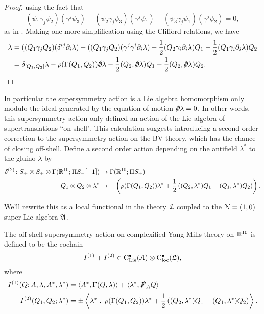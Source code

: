 \documentclass[10pt, oneside]{article}
\begin{document}
\begin{proof}
using the fact that 
\[(\psi_1 \gamma_j \psi_2)(\gamma^j \psi_3) + (\psi_2 \gamma_j \psi_3)(\gamma^j \psi_1) + (\psi_3 \gamma_j \psi_1)(\gamma^j \psi_2) = 0,\]
as in \cite[Theorem 11]{BaezHuerta}.  Making one more simplification using the Clifford relations, we have
\begin{align*}
[\delta_{Q_1}, \delta_{Q_2}] \lambda &= ((Q_1 \gamma_j Q_2) (\delta^{ij} \dd_i \lambda) - ((Q_1 \gamma_j Q_2) (\gamma^j \gamma^i \dd_i \lambda) - \frac 12(Q_2 \gamma_i \dd_i \lambda)Q_1 - \frac 12(Q_1 \gamma_i \dd_i \lambda)Q_2 \\
&= \delta_{[Q_1,Q_2]} \lambda - \rho(\Gamma(Q_1,Q_2)) \sd \dd \lambda - \frac 12(Q_2, \sd \dd \lambda)Q_1 - \frac 12(Q_2, \sd \dd \lambda)Q_2.
\end{align*}
\end{proof}

In particular the supersymmetry action is a Lie algebra homomorphism only modulo the ideal generated by the equation of motion $\sd \dd \lambda = 0$.
In other words, this supersymmetry action only defined an action of the Lie algebra of supertranslations ``on-shell".  This calculation suggests introducing a second order correction to the supersymmetry action on the BV theory, which has the chance of closing off-shell.  Define a second order action depending on the antifield $\lambda^*$ to the gluino $\lambda$ by
\begin{align*}
\delta^{(2)} \colon S_+ \otimes S_+ \otimes \Gamma(\mathbb R^{10}; \Pi S_-[-1]) &\to \Gamma(\mathbb R^{10}; \Pi S_+) \\
Q_1 \otimes Q_2 \otimes \lambda^* &\mapsto - \left(\rho(\Gamma(Q_1,Q_2)) \lambda^* + \frac 12 \left((Q_2, \lambda^*)Q_1 + (Q_1, \lambda^*)Q_2\right)\right).
\end{align*}

We'll rewrite this as a local functional in the theory $\mathfrak L$ coupled to the $\mathcal{N}=(1,0)$ super Lie algebra $\mathfrak{A}$.

\begin{definition}
The off-shell supersymmetry action on complexified Yang-Mills theory on $\mathbb R^{10}$ is defined to be the cochain
\[I^{(1)} + I^{(2)} \in {\rm C}_{\rm Lie}^\bullet(\mathcal{A}) \otimes {\rm C}_{\rm loc}^\bullet(\mathfrak L),\]
where 
\begin{align*}
I ^{(1)} (Q ; A, \lambda, A^*, \lambda^*) & = \langle A^* , \Gamma(Q, \lambda)\rangle + \langle\lambda^*, \slashed{F}_A Q\rangle \\
I^{(2)} (Q_1,Q_2 ; \lambda^*) & = \pm \left\langle\lambda^* \;,\; \rho(\Gamma(Q_1,Q_2)) \lambda^* + \frac 12 \left((Q_2, \lambda^*)Q_1 + (Q_1, \lambda^*)Q_2\right)\right\rangle .
\end{align*}
\end{definition}
\end{document}
